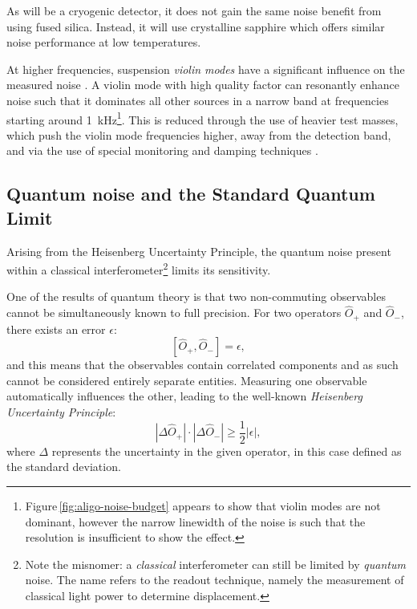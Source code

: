 As \KAGRA{} will be a cryogenic detector, it does not gain the same noise benefit from using fused silica. Instead, it will use crystalline sapphire which offers similar noise performance at low temperatures.

At higher frequencies, suspension \emph{violin modes} have a significant influence on the measured noise \cite{Robertson2002}. A violin mode with high quality factor can resonantly enhance noise such that it dominates all other sources in a narrow band at frequencies starting around \SI{1}{\kilo\hertz}\footnote{Figure\,\ref{fig:aligo-noise-budget} appears to show that violin modes are not dominant, however the narrow linewidth of the noise is such that the resolution is insufficient to show the effect.}. This is reduced through the use of heavier test masses, which push the violin mode frequencies higher, away from the detection band, and via the use of special monitoring and damping techniques \cite{Sorazu2010} .

\subsection{Quantum noise and the Standard Quantum Limit}
Arising from the Heisenberg Uncertainty Principle, the quantum noise present within a classical interferometer\footnote{Note the misnomer: a \emph{classical} interferometer can still be limited by \emph{quantum} noise. The name refers to the readout technique, namely the measurement of classical light power to determine displacement.} limits its sensitivity.

One of the results of quantum theory is that two non-commuting observables cannot be simultaneously known to full precision. For two operators $\hat{O}_+$ and $\hat{O}_-$, there exists an error $\epsilon$:
\begin{equation}
 \left[ \hat{O}_+, \hat{O}_- \right] = \epsilon,
\end{equation}
and this means that the observables contain correlated components and as such cannot be considered entirely separate entities. Measuring one observable automatically influences the other, leading to the well-known \emph{Heisenberg Uncertainty Principle}:
\begin{equation}
 \left| \Delta \hat{O}_+ \right| \cdot \left| \Delta \hat{O}_- \right| \geq
\frac{1}{2} \left| \epsilon \right|,
\end{equation}
where $\Delta$ represents the uncertainty in the given operator, in this case defined as the standard deviation.

